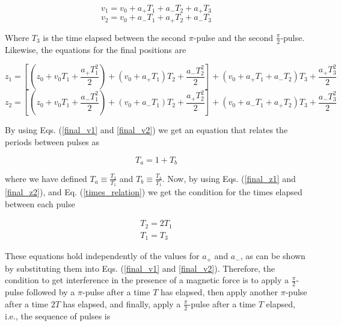 \documentclass{article}
\begin{document}
\begin{equation}\label{final_v1}
v_{1} = v_{0} + a_{+} T_{1} + a_{-} T_{2} + a_{+} T_{3}
\end{equation}
\begin{equation}\label{final_v2}
v_{2} = v_{0} + a_{-} T_{1} + a_{+} T_{2} + a_{-} T_{3}
\end{equation}

Where $T_{3}$ is the time elapsed between the second $\pi$-pulse and the second $\frac{\pi}{2}$-pulse. Likewise, the equations for the final positions are

\begin{equation}\label{final_z1}
z_{1} = [(z_{0} + v_{0} T_{1} + \frac{a_{+} T^{2}_{1}}{2}) + (v_{0} + a_{+}T_{1})T_{2} + \frac{a_{-} T^{2}_{2}}{2}] + (v_{0}+a_{+}T_{1} + a_{-}T_{2})T_{3} + \frac{a_{+} T^{2}_{3}}{2}
\end{equation}
\begin{equation}\label{final_z2}
z_{2} = [(z_{0} + v_{0} T_{1} + \frac{a_{-} T^{2}_{1}}{2}) + (v_{0} + a_{-}T_{1})T_{2} + \frac{a_{+} T^{2}_{2}}{2}] + (v_{0}+a_{-}T_{1} + a_{+}T_{2})T_{3} + \frac{a_{-} T^{2}_{3}}{2}
\end{equation}

By using Eqs. (\ref{final_v1} and \ref{final_v2}) we get an equation that relates the periods between pulses as

\begin{equation}\label{times_relation}
T_{a} = 1 + T_{b}
\end{equation}

where we have defined $T_{a} \equiv \frac{T_{2}}{T_{1}}$ and $T_{b} \equiv \frac{T_{3}}{T_{1}}$. Now, by using Eqs. (\ref{final_z1} and \ref{final_z2}), and Eq. (\ref{times_relation}) we get the condition for the times elapsed between each pulse

\begin{equation}
\begin{aligned}
T_{2} = 2T_{1} \\
T_{1} = T_{3}
\end{aligned}
\end{equation}

These equations hold independently of the values for $a_{+}$ and $a_{-}$, as can be shown by substituting them into Eqs. (\ref{final_v1} and \ref{final_v2}). Therefore, the condition to get interference in the presence of a magnetic force is to apply a 
$\frac{\pi}{2}$-pulse followed by a $\pi$-pulse after a time $T$ has elapsed, then apply another $\pi$-pulse after a time $2T$ has elapsed, and finally, apply a $\frac{\pi}{2}$-pulse after a time $T$ elapsed, i.e., the sequence of pulses is
\end{document}
